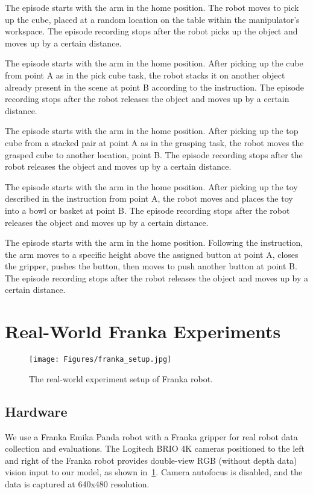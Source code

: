  The episode starts with the arm in the home position. The robot moves to pick up the cube, placed at a random location on the table within the manipulator's workspace. The episode recording stops after the robot picks up the object and moves up by a certain distance.

 The episode starts with the arm in the home position. After picking up the cube from point A as in the pick cube task, the robot stacks it on another object already present in the scene at point B according to the instruction. The episode recording stops after the robot releases the object and moves up by a certain distance.

 The episode starts with the arm in the home position. After picking up the top cube from a stacked pair at point A as in the grasping task, the robot moves the grasped cube to another location, point B. The episode recording stops after the robot releases the object and moves up by a certain distance.

 The episode starts with the arm in the home position. After picking up the toy described in the instruction from point A, the robot moves and places the toy into a bowl or basket at point B. The episode recording stops after the robot releases the object and moves up by a certain distance.

 The episode starts with the arm in the home position. Following the instruction, the arm moves to a specific height above the assigned button at point A, closes the gripper, pushes the button, then moves to push another button at point B. The episode recording stops after the robot releases the object and moves up by a certain distance.






\section{Real-World Franka Experiments}
\label{supp:franka}

\begin{figure}[ht!]
    \centering
    \texttt{[image: Figures/franka\_setup.jpg]}
    \caption{The real-world experiment setup of Franka robot.}
    \label{fig:franka_setup}
\end{figure}

\subsection{Hardware}
We use a Franka Emika Panda robot with a Franka gripper for real robot data collection and evaluations. The Logitech BRIO 4K cameras positioned to the left and right of the Franka robot provides double-view RGB (without depth data) vision input to our model, as shown in~\cref{fig:franka_setup}. Camera autofocus is disabled, and the data is captured at 640x480 resolution. 

